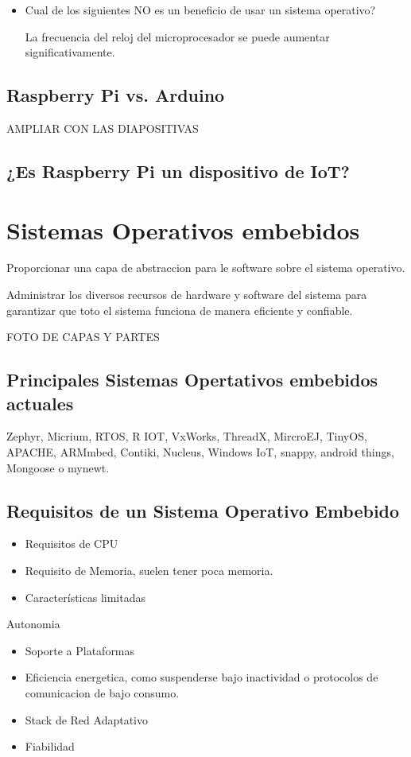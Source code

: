 \documentclass[12pt]{report} %
\begin{document}
\begin{itemize}

\item Cual de los siguientes NO es un beneficio de usar un sistema operativo? 

La frecuencia del reloj del microprocesador se puede aumentar significativamente.
\end{itemize}
 
\subsection{Raspberry Pi vs. Arduino}
AMPLIAR CON LAS DIAPOSITIVAS

\subsection{¿Es Raspberry Pi un dispositivo de IoT?}

\section{Sistemas Operativos embebidos}
Proporcionar una capa de abstraccion para le software sobre el sistema operativo.

Administrar los diversos recursos de hardware y software del sistema para garantizar que toto el sistema funciona de manera eficiente y confiable.

FOTO DE CAPAS Y PARTES

\subsection{Principales Sistemas Opertativos embebidos actuales} 
Zephyr, Micrium, RTOS, R IOT, VxWorks, ThreadX, MircroEJ, TinyOS, APACHE, ARMmbed, Contiki, Nucleus, Windows IoT, snappy, android things, Mongoose o mynewt.

\subsection{Requisitos de un Sistema Operativo Embebido}
\begin{itemize}	
	\item Requisitos de CPU 
	\item Requisito de Memoria, suelen tener poca memoria.
	\item Características limitadas
\end{itemize}

Autonomia
\begin{itemize}	
	\item Soporte a Plataformas
	\item Eficiencia energetica, como suspenderse bajo inactividad o protocolos de comunicacion de bajo consumo.
	\item Stack de Red Adaptativo
	\item Fiabilidad
\end{itemize}
\end{document}
